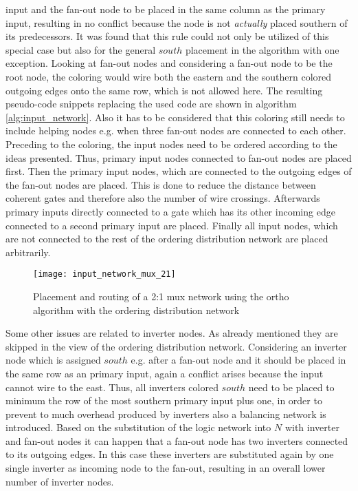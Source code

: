input and the fan-out node to be placed in the same column as the primary input, resulting in no conflict because the node is not \textit{actually} placed southern of its predecessors. It was found that this rule could not only be utilized of this special case but also for the general $south$ placement in the algorithm with one exception. Looking at fan-out nodes and considering a fan-out node to be the root node, the coloring would wire both the eastern and the southern colored outgoing edges onto the same row, which is not allowed here. The resulting pseudo-code snippets replacing the used code are shown in algorithm \ref{alg:input_network}. Also it has to be considered that this coloring still needs to include helping nodes e.g. when three fan-out nodes are connected to each other. Preceding to the coloring, the input nodes need to be ordered according to the ideas presented. Thus, primary input nodes connected to fan-out nodes are placed first. Then the primary input nodes, which are connected to the outgoing edges of the fan-out nodes are placed. This is done to reduce the distance between coherent gates and therefore also the number of wire crossings. Afterwards primary inputs directly connected to a gate which has its other incoming edge connected to a second primary input are placed. Finally all input nodes, which are not connected to the rest of the ordering distribution network are placed arbitrarily.
\begin{figure}
	\centering
	\texttt{[image: input\_network\_mux\_21]}
	\caption{Placement and routing of a 2:1 mux network using the ortho algorithm with the ordering distribution network}\label{fig:input_network_mux_21}
\end{figure}
Some other issues are related to inverter nodes. As already mentioned they are skipped in the view of the ordering distribution network. Considering an inverter node which is assigned $south$ e.g. after a fan-out node and it should be placed in the same row as an primary input, again a conflict arises because the input cannot wire to the east. Thus, all inverters colored $south$ need to be placed to minimum the row of the most southern primary input plus one, in order to prevent to much overhead produced by inverters also a balancing network is introduced. Based on the substitution of the logic network into $N$ with inverter and fan-out nodes it can happen that a fan-out node has two inverters connected to its outgoing edges. In this case these inverters are substituted again by one single inverter as incoming node to the fan-out, resulting in an overall lower number of inverter nodes.
